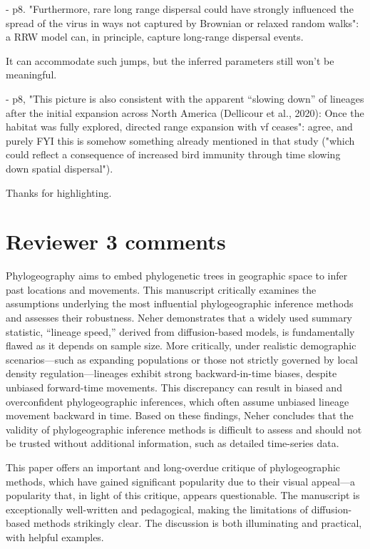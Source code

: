 \documentclass[11pt, oneside]{article}   	%
\newcommand{\response}[1]{{\color{black}{\bf Response:} #1}}
\begin{document}
- p8. "Furthermore, rare long range dispersal could have strongly influenced the spread of the virus in ways not captured by Brownian or relaxed random walks": a RRW model can, in principle, capture long-range dispersal events.

\response{It can accommodate such jumps, but the inferred parameters still won't be meaningful. }

- p8, "This picture is also consistent with the apparent “slowing down” of lineages after the initial expansion across North America (Dellicour et al., 2020): Once the habitat was fully explored, directed range expansion with vf ceases": agree, and purely FYI this is somehow something already mentioned in that study ("which could reflect a consequence of increased bird immunity through time slowing down spatial dispersal").

\response{Thanks for highlighting.}



\section*{Reviewer 3 comments}

Phylogeography aims to embed phylogenetic trees in geographic space to infer past locations and movements. This manuscript critically examines the assumptions underlying the most influential phylogeographic inference methods and assesses their robustness. Neher demonstrates that a widely used summary statistic, “lineage speed,” derived from diffusion-based models, is fundamentally flawed as it depends on sample size. More critically, under realistic demographic scenarios—such as expanding populations or those not strictly governed by local density regulation—lineages exhibit strong backward-in-time biases, despite unbiased forward-time movements. This discrepancy can result in biased and overconfident phylogeographic inferences, which often assume unbiased lineage movement backward in time. Based on these findings, Neher concludes that the validity of phylogeographic inference methods is difficult to assess and should not be trusted without additional information, such as detailed time-series data.

This paper offers an important and long-overdue critique of phylogeographic methods, which have gained significant popularity due to their visual appeal—a popularity that, in light of this critique, appears questionable. The manuscript is exceptionally well-written and pedagogical, making the limitations of diffusion-based methods strikingly clear. The discussion is both illuminating and practical, with helpful examples.
\end{document}
